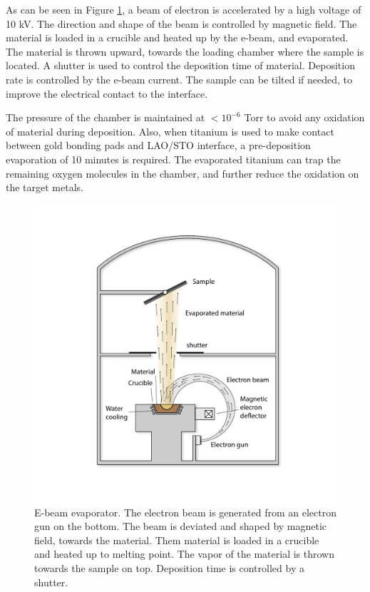 \documentclass[pdflatex, sectionletters, 12pt]{pittetd}    %
\begin{document}
As can be seen in Figure \ref{FIG:Ebeam}, a beam of electron is accelerated by a high voltage of 10 kV. The direction and shape of the beam is controlled by magnetic field. The material is loaded in a crucible and heated up by the e-beam, and evaporated. The material is thrown upward, towards the loading chamber where the sample is located. A shutter is used to control the deposition time of material. Deposition rate is controlled by the e-beam current. The sample can be tilted if needed, to improve the electrical contact to the interface.

The pressure of the chamber is maintained at $< 10^{-6}$ Torr to avoid any oxidation of material during deposition. Also, when titanium is used to make contact between gold bonding pads and LAO/STO interface, a pre-deposition evaporation of 10 minutes is required. The evaporated titanium can trap the remaining oxygen molecules in the chamber, and further reduce the oxidation on the target metals. 

\begin{figure}[p]
	\centering
	\includegraphics[width=1.0\textwidth]{Drawing/Ebeam.pdf}
	\caption{E-beam evaporator. The electron beam is generated from an electron gun on the bottom. The beam is deviated and shaped by magnetic field, towards the material. Them material is loaded in a crucible and heated up to melting point. The vapor of the material is thrown towards the sample on top. Deposition time is controlled by a shutter.}
	\label{FIG:Ebeam}
\end{figure}
\end{document}

